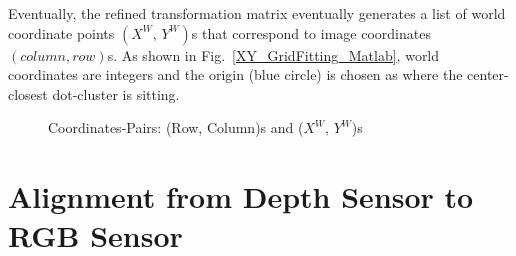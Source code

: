 %
Eventually, the refined transformation matrix eventually generates a list of world coordinate points \((X^W, \, Y^W)\)s that correspond to image coordinates \((column, row)\)s. As shown in Fig.~\ref{XY_GridFitting_Matlab}, world coordinates are integers and the origin (blue circle) is chosen as where the center-closest dot-cluster is sitting.\par%
%
 \begin{figure}[t]
\hspace*{-0.3cm}
\centering
{}
{}
%
\caption{Coordinates-Pairs: (Row, Column)s and (\(X^W\), \(Y^W\))s}
\label{Grid_Fitting}
\end{figure}%
%
%
%
\section{Alignment from Depth Sensor to RGB Sensor}

